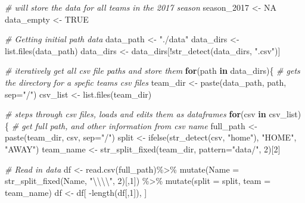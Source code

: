 \documentclass[
]{article}
\newenvironment{Shaded}{\begin{snugshade}}{\end{snugshade}}
\newcommand{\AttributeTok}[1]{\textcolor[rgb]{0.77,0.63,0.00}{#1}}
\newcommand{\CommentTok}[1]{\textcolor[rgb]{0.56,0.35,0.01}{\textit{#1}}}
\newcommand{\ConstantTok}[1]{\textcolor[rgb]{0.00,0.00,0.00}{#1}}
\newcommand{\ControlFlowTok}[1]{\textcolor[rgb]{0.13,0.29,0.53}{\textbf{#1}}}
\newcommand{\DecValTok}[1]{\textcolor[rgb]{0.00,0.00,0.81}{#1}}
\newcommand{\FunctionTok}[1]{\textcolor[rgb]{0.00,0.00,0.00}{#1}}
\newcommand{\NormalTok}[1]{#1}
\newcommand{\OtherTok}[1]{\textcolor[rgb]{0.56,0.35,0.01}{#1}}
\newcommand{\SpecialCharTok}[1]{\textcolor[rgb]{0.00,0.00,0.00}{#1}}
\newcommand{\StringTok}[1]{\textcolor[rgb]{0.31,0.60,0.02}{#1}}
\begin{document}
\begin{Shaded}
\begin{Highlighting}[]
\CommentTok{\# will store the data for all teams in the 2017 season}
\NormalTok{season\_2017 }\OtherTok{\textless{}{-}} \ConstantTok{NA}
\NormalTok{data\_empty }\OtherTok{\textless{}{-}} \ConstantTok{TRUE}

\CommentTok{\# Getting initial path data}
\NormalTok{data\_path }\OtherTok{\textless{}{-}} \StringTok{"./data"}
\NormalTok{data\_dirs }\OtherTok{\textless{}{-}} \FunctionTok{list.files}\NormalTok{(data\_path)}
\NormalTok{data\_dirs }\OtherTok{\textless{}{-}}\NormalTok{ data\_dirs[}\SpecialCharTok{!}\FunctionTok{str\_detect}\NormalTok{(data\_dirs, }\StringTok{".csv"}\NormalTok{)]}

\CommentTok{\# iteratively get all csv file paths and store them}
\ControlFlowTok{for}\NormalTok{(path }\ControlFlowTok{in}\NormalTok{ data\_dirs)\{}
  \CommentTok{\# gets the directory for a spefic teams csv files}
\NormalTok{  team\_dir }\OtherTok{\textless{}{-}} \FunctionTok{paste}\NormalTok{(data\_path, path, }\AttributeTok{sep=}\StringTok{"/"}\NormalTok{)}
\NormalTok{  csv\_list }\OtherTok{\textless{}{-}} \FunctionTok{list.files}\NormalTok{(team\_dir)}
  
  \CommentTok{\# steps through csv files, loads and edits them as dataframes}
  \ControlFlowTok{for}\NormalTok{(csv }\ControlFlowTok{in}\NormalTok{ csv\_list)\{}
    \CommentTok{\# get full path, and other information from csv name}
\NormalTok{    full\_path }\OtherTok{\textless{}{-}} \FunctionTok{paste}\NormalTok{(team\_dir, csv, }\AttributeTok{sep=}\StringTok{"/"}\NormalTok{)}
\NormalTok{    split }\OtherTok{\textless{}{-}} \FunctionTok{ifelse}\NormalTok{(}\FunctionTok{str\_detect}\NormalTok{(csv, }\StringTok{"home"}\NormalTok{), }\StringTok{"HOME"}\NormalTok{, }\StringTok{"AWAY"}\NormalTok{)}
\NormalTok{    team\_name }\OtherTok{\textless{}{-}} \FunctionTok{str\_split\_fixed}\NormalTok{(team\_dir, }\AttributeTok{pattern=}\StringTok{"data/"}\NormalTok{, }\DecValTok{2}\NormalTok{)[}\DecValTok{2}\NormalTok{]}
    
    \CommentTok{\# Read in data}
\NormalTok{    df }\OtherTok{\textless{}{-}} \FunctionTok{read.csv}\NormalTok{(full\_path)}\SpecialCharTok{\%\textgreater{}\%}
      \FunctionTok{mutate}\NormalTok{(}\AttributeTok{Name =} \FunctionTok{str\_split\_fixed}\NormalTok{(Name, }\StringTok{"}\SpecialCharTok{\textbackslash{}\textbackslash{}\textbackslash{}\textbackslash{}}\StringTok{"}\NormalTok{, }\DecValTok{2}\NormalTok{)[,}\DecValTok{1}\NormalTok{]) }\SpecialCharTok{\%\textgreater{}\%}
      \FunctionTok{mutate}\NormalTok{(}\AttributeTok{split =}\NormalTok{ split, }\AttributeTok{team =}\NormalTok{ team\_name)}
\NormalTok{    df }\OtherTok{\textless{}{-}}\NormalTok{ df[ }\SpecialCharTok{{-}}\FunctionTok{length}\NormalTok{(df[,}\DecValTok{1}\NormalTok{]), ]}
    

\end{Highlighting}
\end{Shaded}
\end{document}
